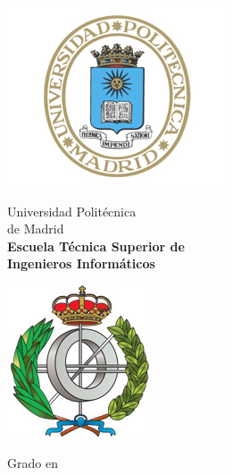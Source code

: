 \begin{titlepage}

  \begin{minipage}{0.15\linewidth}
    \hspace*{-2.5cm}
    \noindent
    \includegraphics[scale=0.5]{./include/EscUpm.png} \qquad\qquad
  \end{minipage}
  \begin{minipage}{0.7\linewidth}
    \begin{center}
      \huge{ Universidad Politécnica\\de Madrid }\\
      \vspace*{0.5cm}
      \Large{\textbf{Escuela Técnica Superior de \\
          Ingenieros Informáticos}}
    \end{center}
  \end{minipage}
  \begin{minipage}{0.2\linewidth}
    \includegraphics[scale=0.5]{./include/FacInformatica.png}
  \end{minipage}

  \vspace*{1cm}
  \begin{center}
    \Large{Grado en  \Grado{} }
  \end{center}


\end{titlepage}
